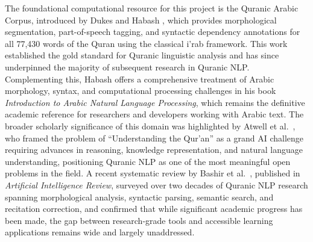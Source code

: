 \documentclass[A4paper,12pt]{article}
\begin{document}
The foundational computational resource for this project is the Quranic Arabic Corpus, introduced
by Dukes and Habash \cite{dukes2010}, which provides morphological segmentation, part-of-speech
tagging, and syntactic dependency annotations for all 77,430 words of the Quran using the classical
i'rab framework. This work established the gold standard for Quranic linguistic analysis and has
since underpinned the majority of subsequent research in Quranic NLP. Complementing this,
Habash \cite{habash2010} offers a comprehensive treatment of Arabic morphology, syntax, and
computational processing challenges in his book \textit{Introduction to Arabic Natural Language
Processing}, which remains the definitive academic reference for researchers and developers working
with Arabic text. The broader scholarly significance of this domain was highlighted by
Atwell et al.\ \cite{atwell2010}, who framed the problem of ``Understanding the Qur'an'' as a
grand AI challenge requiring advances in reasoning, knowledge representation, and natural language
understanding, positioning Quranic NLP as one of the most meaningful open problems in the field.
A recent systematic review by Bashir et al.\ \cite{bashir2022}, published in \textit{Artificial
Intelligence Review}, surveyed over two decades of Quranic NLP research spanning morphological
analysis, syntactic parsing, semantic search, and recitation correction, and confirmed that while
significant academic progress has been made, the gap between research-grade tools and accessible
learning applications remains wide and largely unaddressed.
\end{document}
